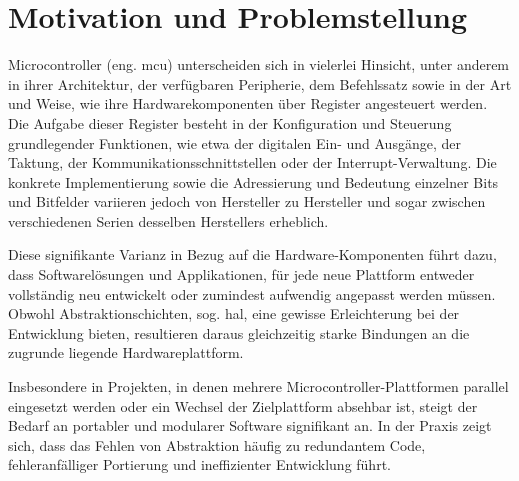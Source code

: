 \section{Motivation und Problemstellung}
Microcontroller (eng. \gls{mcu}) unterscheiden sich in vielerlei Hinsicht, unter anderem in ihrer Architektur, der verfügbaren Peripherie, dem Befehlssatz sowie in der Art und Weise, wie ihre Hardwarekomponenten über Register angesteuert werden.
Die Aufgabe dieser Register besteht in der Konfiguration und Steuerung grundlegender Funktionen, wie etwa der digitalen Ein- und Ausgänge, der Taktung, der Kommunikationsschnittstellen oder der Interrupt-Verwaltung.
Die konkrete Implementierung sowie die Adressierung und Bedeutung einzelner Bits und Bitfelder variieren jedoch von Hersteller zu Hersteller und sogar zwischen verschiedenen Serien desselben Herstellers erheblich.

Diese signifikante Varianz in Bezug auf die Hardware-Komponenten führt dazu, dass Softwarelösungen und Applikationen, für jede neue Plattform entweder vollständig neu entwickelt oder zumindest aufwendig angepasst werden müssen.
Obwohl Abstraktionschichten, sog. \gls{hal}, eine gewisse Erleichterung bei der Entwicklung bieten, resultieren daraus gleichzeitig starke Bindungen an die zugrunde liegende Hardwareplattform.

Insbesondere in Projekten, in denen mehrere Microcontroller-Plattformen parallel eingesetzt werden oder ein Wechsel der Zielplattform absehbar ist, steigt der Bedarf an portabler und modularer Software signifikant an. 
In der Praxis zeigt sich, dass das Fehlen von Abstraktion häufig zu redundantem Code, fehleranfälliger Portierung und ineffizienter Entwicklung führt.

\clearpage

